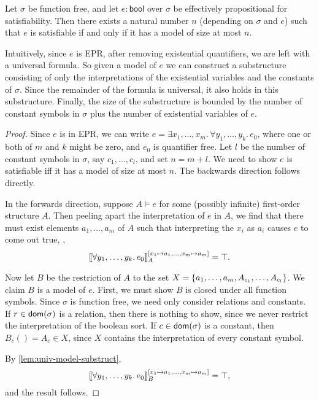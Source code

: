 \begin{lemma}\label{lem:epr-small-model-property}
  Let $\sigma$ be function free,
  and let $e : \mathsf{bool}$ over $\sigma$ be effectively propositional for satisfiability.
  Then there exists a natural number $n$ (depending on $\sigma$ and $e$) such that
  $e$ is satisfiable if and only if it has a model of size at most $n$.

  Intuitively, since $e$ is EPR, after removing existential quantifiers, we are left with a universal formula.
  So given a model of $e$ we can construct a substructure consisting of only the interpretations
  of the existential variables and the constants of $\sigma$. Since the remainder of the formula is universal,
  it also holds in this substructure.
  Finally, the size of the substructure is bounded
  by the number of constant symbols in $\sigma$ plus the number of existential variables of $e$.
\end{lemma}
\begin{proof}
  Since $e$ is in EPR, we can write $e = \exists x_1, \dots, x_m.\, \forall y_1, \dots, y_k.\, e_0$,
  where one or both of $m$ and $k$ might be zero, and $e_0$ is quantifier free.
  Let $l$ be the number of constant symbols in $\sigma$, say $c_1, \dots, c_l$,
  and set $n = m + l$. We need to show $e$ is satisfiable iff it has a model of size at most $n$.
  The backwards direction follows directly.

  In the forwards direction, suppose $A \models e$ for some (possibly infinite) first-order structure $A$.
  Then peeling apart the interpretation of $e$ in $A$, we find that there must exist elements $a_1, \dots, a_m$
  of $A$ such that interpreting the $x_i$ as $a_i$ causes $e$ to come out true, \ie,
  \[
    \llbracket{\forall y_1, \dots, y_k.\, e_0}\rrbracket_A^{[x_1\mapsto a_1, \dots, x_m \mapsto a_m]} = \top.
  \]

  Now let $B$ be the restriction of $A$ to the set $X = \left\{{a_1, \dots, a_m, A_{c_1}, \dots, A_{c_l}}\right\}$.
  We claim $B$ is a model of $e$.
  First, we must show $B$ is closed under all function symbols.
  Since $\sigma$ is function free, we need only consider relations and constants.
  If $r\in\mathsf{dom}(\sigma)$ is a relation, then there is nothing to show,
  since we never restrict the interpretation of the boolean sort.
  If $c\in\mathsf{dom}(\sigma)$ is a constant, then $B_c() = A_c \in X$,
  since $X$ contains the interpretation of every constant symbol.

  By \cref{lem:univ-model-substruct},
  \[
    \llbracket{\forall y_1, \dots, y_k.\, e_0}\rrbracket_B^{[x_1\mapsto a_1, \dots, x_m \mapsto a_m]} = \top,
  \]
  and the result follows.
\end{proof}

